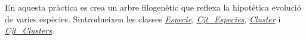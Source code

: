 En aquesta pràctica es crea un arbre filogenètic que reflexa la hipotètica evolució de varies espècies. S\textquotesingle{}introdueixen les classes {\itshape \hyperlink{class_especie}{Especie}}, {\itshape \hyperlink{class_cjt___especies}{Cjt\+\_\+\+Especies}}, {\itshape \hyperlink{class_cluster}{Cluster}} i {\itshape \hyperlink{class_cjt___clusters}{Cjt\+\_\+\+Clusters}}. 